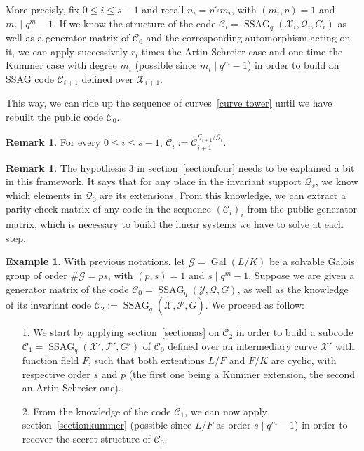 \documentclass[10pt]{article}
\theoremstyle{definition}
\newtheorem{rq1}[thm]{Remark}
\theoremstyle{definition}
\newtheorem{expl}[thm]{Example}
\theoremstyle{definition}
\newcommand{\C}{\mathcal{C}}
\newcommand{\X}{\mathcal{X}}
\newcommand{\Y}{\mathcal{Y}}
\newcommand{\PR}{\mathcal{P}}
\newcommand{\QR}{\mathcal{Q}}
\newcommand{\G}{\mathcal{G}}
\newcommand{\Gal}{\operatorname{Gal}}
\newcommand{\ssag}{\operatorname{SSAG}}
\begin{document}
  More precisly, fix $0 \leq i \leq s-1$ and recall $n_i = p^{r_i}m_i$, with $(m_i,p)=1$ and $m_i \mid q^m-1$. If we know the structure of the code $\C_i = \ssag_q(\X_i,\QR_i,G_i)$ as well as a generator matrix of $\C_0$ and the corresponding automorphism acting on it, we can apply successively $r_i$-times the Artin-Schreier case and one time the Kummer case with degree $m_i$ (possible since $m_i \mid q^m-1$) in order to build an SSAG code $\C_{i+1}$ defined over $\X_{i+1}$. 

 This way, we can ride up the sequence of curves~\eqref{curve tower} until we have rebuilt the public code $\C_0$. 

\begin{rq1}
For every $0 \leq i \leq s-1$, $\C_i := \C_{i+1}^{\G_{i+1}/\G_i}$. 
\end{rq1}

\begin{rq1} \label{induced permutation} The hypothesis 3 in section~\ref{sectionfour} needs to be explained a bit in this framework. It says that for any place in the invariant support $\QR_s$, we know which elements in $\QR_0$ are its extensions. From this knowledge, we can extract a parity check matrix of any code in the sequence $(\C_i)_i$ from the public generator matrix, which is necessary to build the linear systems we have to solve at each step. 
\end{rq1}

\begin{expl} With previous notations, let $\G=\Gal(L/K)$ be a solvable Galois group of order $\#\G = ps$, with $(p,s)=1$ and $s \mid q^m-1$. Suppose we are given a generator matrix of the code $\C_0 = \ssag_q(\Y,\QR,G)$, as well as the knowledge of its invariant code $\C_2 := \ssag_q(\X,\PR,\tilde{G})$. We proceed as follow: 
\begin{enumerate}
\item[1.] We start by applying section~\ref{sectionas} on $\C_2$ in order to build a subcode $\C_1 = \ssag_q(\X',\PR',G')$ of $\C_0$ defined over an intermediary curve $\X'$ with function field $F$, such that both extentions $L/F$ and $F/K$ are cyclic, with respective order $s$ and $p$ (the first one being a Kummer extension, the second an Artin-Schreier one).
\item[2.] From the knowledge of the code $\C_1$, we can now apply section~\ref{sectionkummer} (possible since $L/F$ as order $s \mid q^m-1$) in order to recover the secret structure of $\C_0$.
\end{enumerate}
\end{expl}
\end{document}
